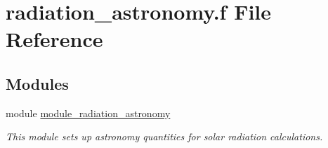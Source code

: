 \hypertarget{radiation__astronomy_8f}{}\section{radiation\+\_\+astronomy.\+f File Reference}
\label{radiation__astronomy_8f}
\subsection*{Modules}
\begin{DoxyCompactItemize}
\item 
module \hyperlink{namespacemodule__radiation__astronomy}{module\+\_\+radiation\+\_\+astronomy}
\begin{DoxyCompactList}\small\item\em This module sets up astronomy quantities for solar radiation calculations. \end{DoxyCompactList}\end{DoxyCompactItemize}
